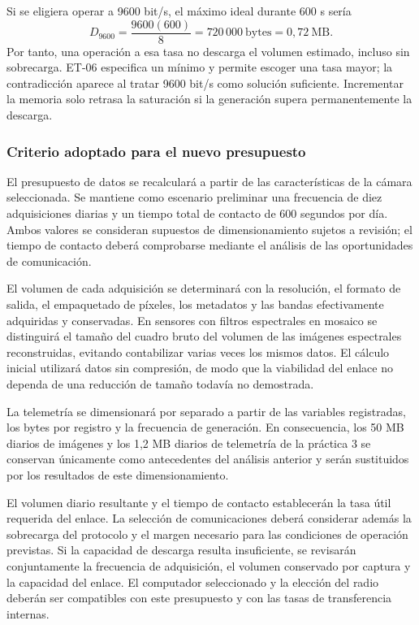 \documentclass[11pt,letterpaper]{article}
\begin{document}
Si se eligiera operar a 9600 bit/s, el máximo ideal durante 600 s sería
\begin{equation}
D_{9600}=\frac{9600(600)}{8}=720\,000\ \mathrm{bytes}=0,72\ \mathrm{MB}.
\end{equation}
Por tanto, una operación a esa tasa no descarga el volumen estimado, incluso sin sobrecarga. ET-06 especifica un mínimo y permite escoger una tasa mayor; la contradicción aparece al tratar 9600 bit/s como solución suficiente. Incrementar la memoria solo retrasa la saturación si la generación supera permanentemente la descarga.

\subsubsection{Criterio adoptado para el nuevo presupuesto}
El presupuesto de datos se recalculará a partir de las características
de la cámara seleccionada. Se mantiene como escenario preliminar una
frecuencia de diez adquisiciones diarias y un tiempo total de contacto
de 600 segundos por día. Ambos valores se consideran supuestos de
dimensionamiento sujetos a revisión; el tiempo de contacto deberá
comprobarse mediante el análisis de las oportunidades de comunicación.

El volumen de cada adquisición se determinará con la resolución, el
formato de salida, el empaquetado de píxeles, los metadatos y las bandas
efectivamente adquiridas y conservadas. En sensores con filtros
espectrales en mosaico se distinguirá el tamaño del cuadro bruto del
volumen de las imágenes espectrales reconstruidas, evitando contabilizar
varias veces los mismos datos. El cálculo inicial utilizará datos sin
compresión, de modo que la viabilidad del enlace no dependa de una
reducción de tamaño todavía no demostrada.

La telemetría se dimensionará por separado a partir de las variables
registradas, los bytes por registro y la frecuencia de generación.
En consecuencia, los 50 MB diarios de imágenes y los 1,2 MB diarios
de telemetría de la práctica 3 se conservan únicamente como antecedentes
del análisis anterior y serán sustituidos por los resultados de este
dimensionamiento.

El volumen diario resultante y el tiempo de contacto establecerán la
tasa útil requerida del enlace. La selección de comunicaciones deberá
considerar además la sobrecarga del protocolo y el margen necesario
para las condiciones de operación previstas. Si la capacidad de descarga
resulta insuficiente, se revisarán conjuntamente la frecuencia de
adquisición, el volumen conservado por captura y la capacidad del enlace.
El computador seleccionado y la elección del radio deberán ser compatibles
con este presupuesto y con las tasas de transferencia internas.
\end{document}
